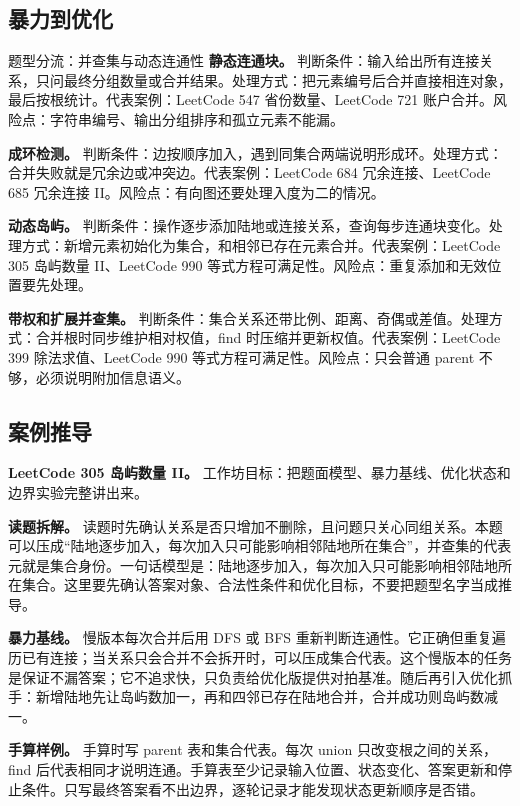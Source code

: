\subsection{暴力到优化}

\begin{principlebox}{题型分流：并查集与动态连通性}
\textbf{静态连通块。}
判断条件：输入给出所有连接关系，只问最终分组数量或合并结果。处理方式：把元素编号后合并直接相连对象，最后按根统计。代表案例：LeetCode 547 省份数量、LeetCode 721 账户合并。风险点：字符串编号、输出分组排序和孤立元素不能漏。

\textbf{成环检测。}
判断条件：边按顺序加入，遇到同集合两端说明形成环。处理方式：合并失败就是冗余边或冲突边。代表案例：LeetCode 684 冗余连接、LeetCode 685 冗余连接 II。风险点：有向图还要处理入度为二的情况。

\textbf{动态岛屿。}
判断条件：操作逐步添加陆地或连接关系，查询每步连通块变化。处理方式：新增元素初始化为集合，和相邻已存在元素合并。代表案例：LeetCode 305 岛屿数量 II、LeetCode 990 等式方程可满足性。风险点：重复添加和无效位置要先处理。

\textbf{带权和扩展并查集。}
判断条件：集合关系还带比例、距离、奇偶或差值。处理方式：合并根时同步维护相对权值，find 时压缩并更新权值。代表案例：LeetCode 399 除法求值、LeetCode 990 等式方程可满足性。风险点：只会普通 parent 不够，必须说明附加信息语义。

\end{principlebox}

\subsection{案例推导}

\noindent\textbf{LeetCode 305 岛屿数量 II。} 工作坊目标：把题面模型、暴力基线、优化状态和边界实验完整讲出来。

\textbf{读题拆解。} 读题时先确认关系是否只增加不删除，且问题只关心同组关系。本题可以压成“陆地逐步加入，每次加入只可能影响相邻陆地所在集合”，并查集的代表元就是集合身份。一句话模型是：陆地逐步加入，每次加入只可能影响相邻陆地所在集合。这里要先确认答案对象、合法性条件和优化目标，不要把题型名字当成推导。

\textbf{暴力基线。} 慢版本每次合并后用 DFS 或 BFS 重新判断连通性。它正确但重复遍历已有连接；当关系只会合并不会拆开时，可以压成集合代表。这个慢版本的任务是保证不漏答案；它不追求快，只负责给优化版提供对拍基准。随后再引入优化抓手：新增陆地先让岛屿数加一，再和四邻已存在陆地合并，合并成功则岛屿数减一。

\textbf{手算样例。} 手算时写 parent 表和集合代表。每次 union 只改变根之间的关系，find 后代表相同才说明连通。手算表至少记录输入位置、状态变化、答案更新和停止条件。只写最终答案看不出边界，逐轮记录才能发现状态更新顺序是否错。

